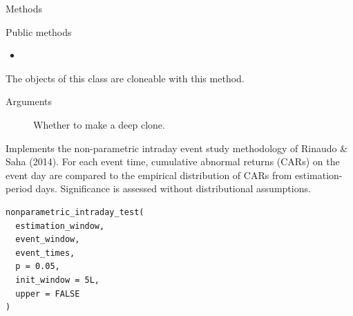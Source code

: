 \documentclass[a4paper]{book}
\begin{document}
\begin{Section}{Methods}
%
\begin{SubSection}{Public methods}
\begin{itemize}

\item{} 

\end{itemize}

\end{SubSection}




\hypertarget{method-MultiEventStatisticsSet-clone}{}
%
\begin{SubSection}{}
The objects of this class are cloneable with this method.
%

%
\begin{SubSubSection}{Arguments}

\begin{description}

\item[] Whether to make a deep clone.

\end{description}



\end{SubSubSection}

\end{SubSection}


\end{Section}
%
\begin{Description}
Implements the non-parametric intraday event study methodology of
Rinaudo \& Saha (2014). For each event time, cumulative abnormal returns
(CARs) on the event day are compared to the empirical distribution of CARs
from estimation-period days. Significance is assessed without distributional
assumptions.
\end{Description}
%
\begin{Usage}
\begin{verbatim}
nonparametric_intraday_test(
  estimation_window,
  event_window,
  event_times,
  p = 0.05,
  init_window = 5L,
  upper = FALSE
)
\end{verbatim}
\end{Usage}
\end{document}
